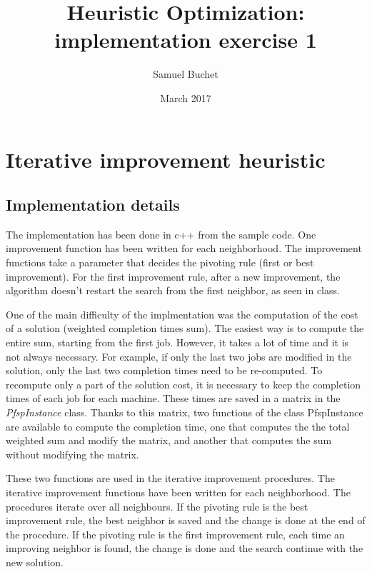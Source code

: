 \documentclass{article}
\title{Heuristic Optimization: implementation exercise 1}
\author{Samuel Buchet}
\date{March 2017}
\begin{document}
\maketitle

\section{Iterative improvement heuristic}

\subsection{Implementation details}

The implementation has been done in c++ from the sample code.
One improvement function has been written for each neighborhood.
The improvement functions take a parameter that decides the pivoting rule (first or best improvement).
For the first improvement rule, after a new improvement, the algorithm doesn't restart the search from the first neighbor, as seen in class. \newline

One of the main difficulty of the implmentation was the computation of the cost of a solution (weighted completion times sum). The easiest way is to compute the entire sum, starting from the first job.
However, it takes a lot of time and it is not always necessary.
For example, if only the last two jobs are modified in the solution, only the last two completion times need to be re-computed.
To recompute only a part of the solution cost, it is necessary to keep the completion times of each job for each machine.
These times are saved in a matrix in the \textit{PfspInstance} class.
Thanks to this matrix, two functions of the class PfspInstance are available to compute the completion time, one that computes the the total weighted sum and modify the matrix, and another that computes the sum without modifying the matrix.\newline

These two functions are used in the iterative improvement procedures.
The iterative improvement functions have been written for each neighborhood.
The procedures iterate over all neighbours.
If the pivoting rule is the best improvement rule, the best neighbor is saved and the change is done at the end of the procedure.
If the pivoting rule is the first improvement rule, each time an improving neighbor is found, the change is done and the search continue with the new solution. \newline
\end{document}
